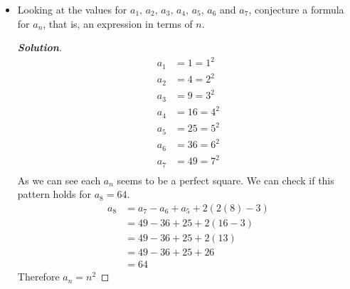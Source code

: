 \documentclass[11pt]{article}
\newenvironment{problem}[2][Problem\!]{\begin{trivlist}
\item[\hskip \labelsep {\bfseries #1}\hskip \labelsep {\bfseries #2.}]}{\end{trivlist}}
\newenvironment{solution}{\begin{proof}[\textbf{\textit{Solution}}]}{\end{proof}}
\begin{document}
\begin{problem}{6.2}
\begin{itemize}[itemsep=3em]
\item[(b)] Looking at the values for $a_1,\,a_2,\,a_3,\,a_4,\,a_5,\,a_6$ and $a_7$, conjecture a formula for $a_n$, that is, an expression in terms of $n$.
\begin{solution}\hfill %
\begin{align*}
a_1 &= 1 = 1^2 \\
a_2 &= 4  = 2^2\\
a_3 &= 9  = 3^2\\
a_4 &= 16  = 4^2\\
a_5 &= 25 = 5^2\\
a_6 &= 36 = 6^2\\
a_7 &= 49 = 7^2\\
\end{align*}
As we can see each \(a_n\) seems to be a perfect square. We can check if this pattern holds for \(a_8 = 64\).
\begin{align*}
a_8 &= a_7 - a_6 + a_5 + 2(2(8) - 3) \\
&= 49 - 36 + 25 + 2(16 - 3) \\
&= 49 - 36 + 25 + 2(13) \\
&= 49 - 36 + 25 + 26 \\
&= 64
\end{align*}
Therefore \(a_n = n^2\)
\end{solution}


\end{itemize}
\end{problem}
\end{document}
